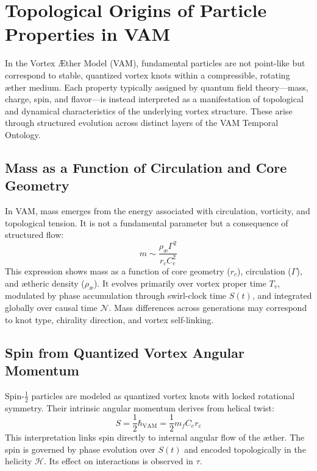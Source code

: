 \section{Topological Origins of Particle Properties in VAM}

In the Vortex \AE{}ther Model (VAM), fundamental particles are not point-like but correspond to stable, quantized vortex knots within a compressible, rotating \ae{}ther medium. Each property typically assigned by quantum field theory---mass, charge, spin, and flavor---is instead interpreted as a manifestation of topological and dynamical characteristics of the underlying vortex structure. These arise through structured evolution across distinct layers of the VAM Temporal Ontology.

\subsection{Mass as a Function of Circulation and Core Geometry}

In VAM, mass emerges from the energy associated with circulation, vorticity, and topological tension. It is not a fundamental parameter but a consequence of structured flow:
\[
m \sim \frac{\rho_\text{\ae} \Gamma^2}{r_c C_e^2}
\]
This expression shows mass as a function of core geometry ($r_c$), circulation ($\Gamma$), and \ae{}theric density ($\rho_\text{\ae}$). It evolves primarily over vortex proper time $T_v$, modulated by phase accumulation through swirl-clock time $S(t)$, and integrated globally over causal time $\mathcal{N}$. Mass differences across generations may correspond to knot type, chirality direction, and vortex self-linking.

\subsection{Spin from Quantized Vortex Angular Momentum}

Spin-$\tfrac{1}{2}$ particles are modeled as quantized vortex knots with locked rotational symmetry. Their intrinsic angular momentum derives from helical twist:
\begin{equation}
S = \frac{1}{2} \hbar_\text{VAM} = \frac{1}{2} m_f C_e r_c
\end{equation}
This interpretation links spin directly to internal angular flow of the \ae{}ther. The spin is governed by phase evolution over $S(t)$ and encoded topologically in the helicity $\mathcal{H}$. Its effect on interactions is observed in $\tau$.

